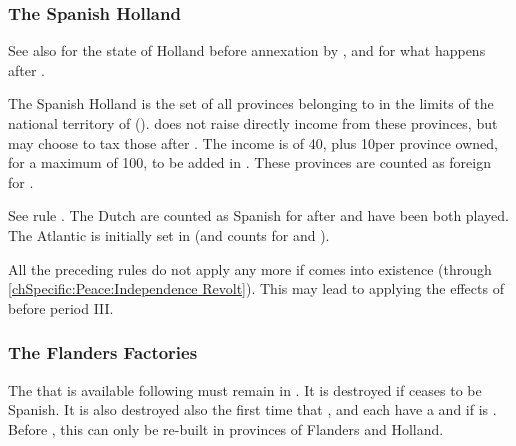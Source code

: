 \subsubsection{The Spanish Holland}\label{chSpecific:Spain:Spanish Holland}
\aparag See also  for the state of Holland before
annexation by \SPA, and  for what
happens after .

 \label{chSpecific:Spain:Dutch Tax} The Spanish
Holland is the set of all provinces belonging to \SPA in the limits of
the national territory of 
(). \SPA does not raise directly income
from these provinces, but may choose to tax those after
.
\bparag The income is of 40\ducats, plus 10\ducats per province owned,
for a maximum of 100\ducats, to be added in .
\bparag These provinces are counted as foreign for
.

 See rule .
\bparag The Dutch \TradeFLEET are counted as Spanish for
 after  and
 have been both played. The Atlantic
 is initially set in  (and
counts for  and ).
%

\aparag All the preceding rules do not apply any more if
 comes into existence (through
\ref{chSpecific:Peace:Independence Revolt}). This may lead to applying
the effects of  before period III.


\subsubsection{The Flanders Factories}\label{chSpecific:Spain:Cloth}
\aparag The  \MNU that is available following
 must remain in
. It is destroyed if  ceases
to be Spanish.
\bparag It is also destroyed also the first time that \ENG, \HOL and
\FRA each have a  \MNU and if \SPA is
.
\bparag Before , this  \MNU can only
be re-built in provinces of Flanders and Holland.



